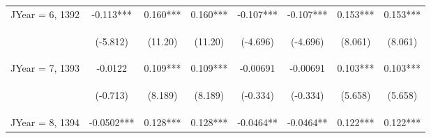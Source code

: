 \documentclass[]{article}
\begin{document}
\begin{center}
\begin{tabular}{lccccccc}
JYear = 6, 1392 & -0.113*** & 0.160*** & 0.160*** & -0.107*** & -0.107*** & 0.153*** & 0.153*** \\
\vspace{4pt} & \begin{footnotesize}(-5.812)\end{footnotesize} & \begin{footnotesize}(11.20)\end{footnotesize} & \begin{footnotesize}(11.20)\end{footnotesize} & \begin{footnotesize}(-4.696)\end{footnotesize} & \begin{footnotesize}(-4.696)\end{footnotesize} & \begin{footnotesize}(8.061)\end{footnotesize} & \begin{footnotesize}(8.061)\end{footnotesize} \\
JYear = 7, 1393 & -0.0122 & 0.109*** & 0.109*** & -0.00691 & -0.00691 & 0.103*** & 0.103*** \\
\vspace{4pt} & \begin{footnotesize}(-0.713)\end{footnotesize} & \begin{footnotesize}(8.189)\end{footnotesize} & \begin{footnotesize}(8.189)\end{footnotesize} & \begin{footnotesize}(-0.334)\end{footnotesize} & \begin{footnotesize}(-0.334)\end{footnotesize} & \begin{footnotesize}(5.658)\end{footnotesize} & \begin{footnotesize}(5.658)\end{footnotesize} \\
JYear = 8, 1394 & -0.0502*** & 0.128*** & 0.128*** & -0.0464** & -0.0464** & 0.122*** & 0.122*** \\

\end{tabular}
\end{center}
\end{document}
